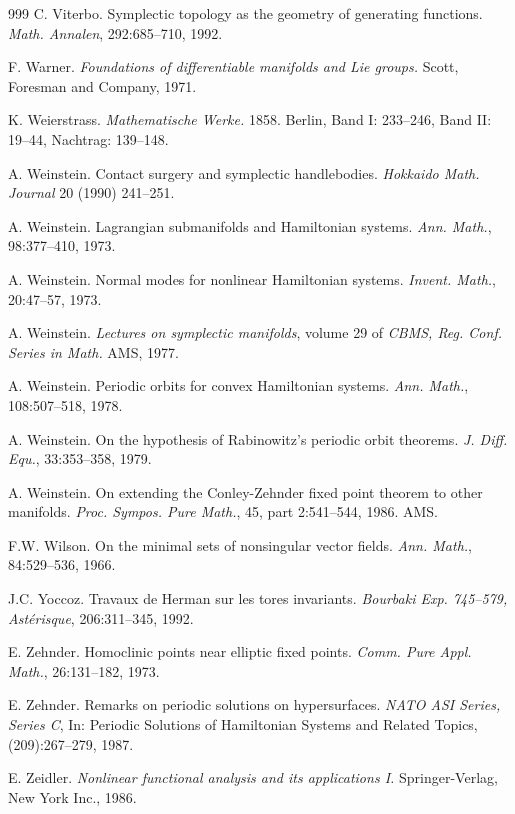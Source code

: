 \begin{thebibliography}{999}
 C. Viterbo. Symplectic topology as the geometry of
generating functions. \emph{Math. Annalen}, 292:685--710, 1992.

 F. Warner. \emph{Foundations of differentiable manifolds and
Lie groups.} Scott, Foresman and Company, 1971.

 K. Weierstrass. \emph{Mathematische Werke.} 1858. Berlin,
Band I: 233--246, Band II: 19--44, Nachtrag: 139--148.

 A. Weinstein. Contact surgery and symplectic handlebodies.
\emph{Hokkaido Math. Journal} 20 (1990) 241--251.

 A. Weinstein. Lagrangian submanifolds and Hamiltonian
systems. \emph{Ann. Math.}, 98:377--410, 1973.

 A. Weinstein. Normal modes for nonlinear Hamiltonian
systems. \emph{Invent. Math.}, 20:47--57, 1973.

 A. Weinstein. \emph{Lectures on symplectic manifolds},
volume 29 of \emph{CBMS, Reg. Conf. Series in Math.} AMS, 1977.

 A. Weinstein. Periodic orbits for convex Hamiltonian
systems. \emph{Ann. Math.}, 108:507--518, 1978.

 A. Weinstein. On the hypothesis of Rabinowitz's periodic
orbit theorems. \emph{J. Diff. Equ.}, 33:353--358, 1979.

 A. Weinstein. On extending the Conley-Zehnder fixed point
theorem to other manifolds. \emph{Proc. Sympos. Pure Math.}, 45,
part 2:541--544, 1986. AMS.

 F.W. Wilson. On the minimal sets of nonsingular vector
fields. \emph{Ann. Math.}, 84:529--536, 1966.

 J.C. Yoccoz. Travaux de Herman sur les tores invariants.
\emph{Bourbaki Exp. 745--579, Astérisque}, 206:311--345, 1992.

 E. Zehnder. Homoclinic points near elliptic fixed points.
\emph{Comm. Pure Appl. Math.}, 26:131--182, 1973.

 E. Zehnder. Remarks on periodic solutions on hypersurfaces.
\emph{NATO ASI Series, Series C}, In: Periodic Solutions of Hamiltonian
Systems and Related Topics,(209):267--279, 1987.

 E. Zeidler. \emph{Nonlinear functional analysis and its
applications I.} Springer-Verlag, New York Inc., 1986.

\end{thebibliography}
